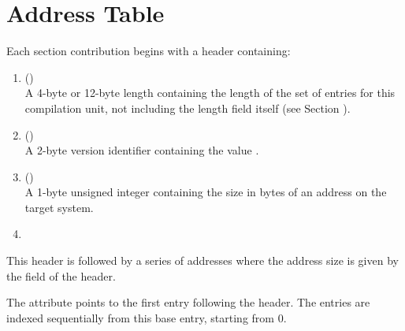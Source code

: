 \section{Address Table}
\label{datarep:addresstable}
Each 
\bb
\dotdebugaddr{} section contribution
\eb
begins with a header containing:
\begin{enumerate}[1. ]
\item \HFNunitlength{} () \\
A 4-byte or 12-byte length containing the length of
the set of entries for this compilation unit, not
including the length field itself
\bb
(see Section ).
\eb

\item  \HFNversion{} (\HFTuhalf) \\
A 2-byte version identifier containing the value
\versiondotdebugaddr{}.

\item	\HFNaddresssize{} (\HFTubyte) \\
A 1-byte unsigned integer containing the size in
bytes of an address
\db
on the target system.

\item	\HFNreservedwassegmentselectorsize{} 
\db
\\

\end{enumerate}

This header is followed by a series of 
\bb
addresses where
\eb
the address size is given by the \HFNaddresssize{}
field of the header. 
\db

The \DWATaddrbase{} attribute points to the first entry
following the header. The entries are indexed sequentially
from this base entry, starting from 0.

